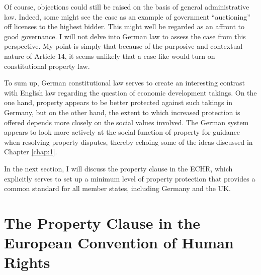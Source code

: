 \documentclass[12pt,a4paper]{book} %
\begin{document}
Of course, objections could still be raised on the basis of general administrative law. Indeed, some might see the case as an example of government ``auctioning'' off licenses to the highest bidder. This might well be regarded as an affront to good governance. I will not delve into German law to assess the case from this perspective. My point is simply that because of the purposive and contextual nature of Article 14, it seems unlikely that a case like \textcite{sainsbury10} would turn on constitutional property law.

To sum up, German constitutional law serves to create an interesting contrast with English law regarding the question of economic development takings. On the one hand, property appears to be better protected against such takings in Germany, but on the other hand, the extent to which increased protection is offered depends more closely on the social values involved. The German system appears to look more actively at the social function of property for guidance when resolving property disputes, thereby echoing some of the ideas discussed in Chapter \ref{chap:1}. 

In the next section, I will discuss the property clause in the ECHR, which explicitly serves to set up a minimum level of property protection that provides a common standard for all member states, including Germany and the UK.

\section{The Property Clause in the European Convention of Human Rights}
\end{document}
